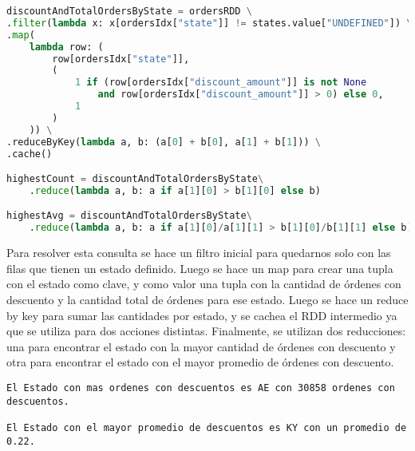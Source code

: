 \begin{lstlisting}[language=Python, caption=Resolución de la consulta 1 propuesta por el enunciado, label={lst:enunciado_q1}, xleftmargin=0pt, xrightmargin=0pt]
discountAndTotalOrdersByState = ordersRDD \
.filter(lambda x: x[ordersIdx["state"]] != states.value["UNDEFINED"]) \
.map(
    lambda row: (
        row[ordersIdx["state"]], 
        (
            1 if (row[ordersIdx["discount_amount"]] is not None 
                and row[ordersIdx["discount_amount"]] > 0) else 0,
            1
        )
    )) \
.reduceByKey(lambda a, b: (a[0] + b[0], a[1] + b[1])) \
.cache()

highestCount = discountAndTotalOrdersByState\
    .reduce(lambda a, b: a if a[1][0] > b[1][0] else b)

highestAvg = discountAndTotalOrdersByState\
    .reduce(lambda a, b: a if a[1][0]/a[1][1] > b[1][0]/b[1][1] else b)
\end{lstlisting}

Para resolver esta consulta se hace un filtro inicial para quedarnos solo con las filas que tienen un estado definido. Luego se hace un map para crear una tupla con el estado como clave, y como valor una tupla con la cantidad de órdenes con descuento y la cantidad total de órdenes para ese estado. Luego se hace un reduce by key para sumar las cantidades por estado, y se cachea el RDD intermedio ya que se utiliza para dos acciones distintas. Finalmente, se utilizan dos reducciones: una para encontrar el estado con la mayor cantidad de órdenes con descuento y otra para encontrar el estado con el mayor promedio de órdenes con descuento.

\begin{lstlisting}[style=console, caption=Resultados de la consulta 1 propuesta por el enunciado, label={lst:enunciado_q1_results}, xleftmargin=0pt, xrightmargin=0pt]
El Estado con mas ordenes con descuentos es AE con 30858 ordenes con descuentos.

El Estado con el mayor promedio de descuentos es KY con un promedio de 0.22.
\end{lstlisting}


